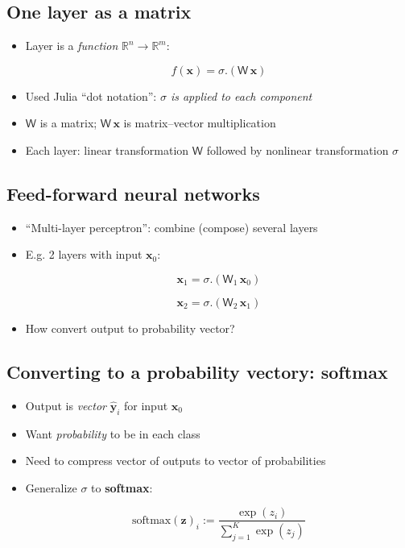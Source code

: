 \hypertarget{one-layer-as-a-matrix}{%
\subsection{One layer as a matrix}\label{one-layer-as-a-matrix}}

\begin{itemize}
\item
  Layer is a \emph{function} \(\mathbb{R}^n \to \mathbb{R}^m\):

  \[f(\mathbf{x}) = \sigma.(\mathsf{W} \, \mathbf{x})\]
\item
  Used Julia ``dot notation'': \emph{\(\sigma\) is applied to each
  component}
\item
  \(\mathsf{W}\) is a matrix; \(\mathsf{W} \, \mathbf{x}\) is
  matrix--vector multiplication
\item
  Each layer: linear transformation \(\mathsf{W}\) followed by nonlinear
  transformation \(\sigma\)
\end{itemize}

\hypertarget{feed-forward-neural-networks}{%
\subsection{Feed-forward neural
networks}\label{feed-forward-neural-networks}}

\begin{itemize}
\item
  ``Multi-layer perceptron'': combine (compose) several layers
\item
  E.g. 2 layers with input \(\mathbf{x}_0\):

  \[\mathbf{x}_1 = \sigma.(\mathsf{W}_1 \, \mathbf{x}_0)\]

  \[\mathbf{x}_2 = \sigma.(\mathsf{W}_2 \, \mathbf{x}_1)\]
\item
  How convert output to probability vector?
\end{itemize}

\hypertarget{converting-to-a-probability-vectory-softmax}{%
\subsection{Converting to a probability vectory:
softmax}\label{converting-to-a-probability-vectory-softmax}}

\begin{itemize}
\item
  Output is \emph{vector} \(\hat{\mathbf{y}}_i\) for input
  \(\mathbf{x}_0\)
\item
  Want \emph{probability} to be in each class
\item
  Need to compress vector of outputs to vector of probabilities
\item
  Generalize \(\sigma\) to \textbf{softmax}:

  \[\text{softmax}(\mathbf{z})_i := \frac{\exp(z_i)}{\sum_{j=1}^K \exp(z_j)}\]
\end{itemize}


